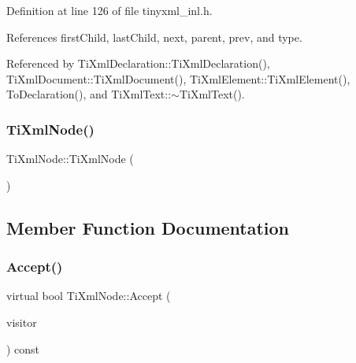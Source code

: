 Definition at line 126 of file tinyxml\+\_\+inl.\+h.



References first\+Child, last\+Child, next, parent, prev, and type.



Referenced by Ti\+Xml\+Declaration\+::\+Ti\+Xml\+Declaration(), Ti\+Xml\+Document\+::\+Ti\+Xml\+Document(), Ti\+Xml\+Element\+::\+Ti\+Xml\+Element(), To\+Declaration(), and Ti\+Xml\+Text\+::$\sim$\+Ti\+Xml\+Text().

\hypertarget{class_ti_xml_node_a5ca3233e05032d121b13fac8273de68d}{}\label{class_ti_xml_node_a5ca3233e05032d121b13fac8273de68d} 
\subsubsection{\texorpdfstring{Ti\+Xml\+Node()}{TiXmlNode()}\hspace{0.1cm}{\footnotesize\ttfamily [2/2]}}
{\footnotesize\ttfamily Ti\+Xml\+Node\+::\+Ti\+Xml\+Node (\begin{DoxyParamCaption}\item[{const \hyperlink{class_ti_xml_node}{Ti\+Xml\+Node} \&}]{ }\end{DoxyParamCaption})\hspace{0.3cm}{\ttfamily [private]}}



\subsection{Member Function Documentation}
\hypertarget{class_ti_xml_node_acc0f88b7462c6cb73809d410a4f5bb86}{}\label{class_ti_xml_node_acc0f88b7462c6cb73809d410a4f5bb86} 
\subsubsection{\texorpdfstring{Accept()}{Accept()}}
{\footnotesize\ttfamily virtual bool Ti\+Xml\+Node\+::\+Accept (\begin{DoxyParamCaption}\item[{\hyperlink{class_ti_xml_visitor}{Ti\+Xml\+Visitor} $\ast$}]{visitor }\end{DoxyParamCaption}) const\hspace{0.3cm}{\ttfamily [pure virtual]}}

